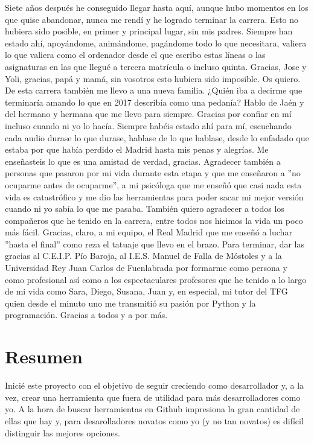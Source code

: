 \documentclass[a4paper, 12pt]{book}
\begin{document}
Siete años después he conseguido llegar hasta aquí, aunque hubo momentos en los que quise abandonar, nunca me rendí y he logrado terminar la carrera. Esto no hubiera sido posible, en primer y principal lugar, sin mis padres. Siempre han estado ahí, apoyándome, animándome, pagándome todo lo que necesitara, valiera lo que valiera como el ordenador desde el que escribo estas líneas o las asignaturas en las que llegué a tercera matrícula o incluso quinta. Gracias, Jose y Yoli, gracias, papá y mamá, sin vosotros esto hubiera sido imposible. Os quiero.
De esta carrera también me llevo a una nueva familia. ¿Quién iba a decirme que terminaría amando lo que en 2017 describía como una pedanía? Hablo de Jaén y del hermano y hermana que me llevo para siempre. Gracias por confiar en mí incluso cuando ni yo lo hacía. Siempre habéis estado ahí para mí, escuchando cada audio durase lo que durase, hablase de lo que hablase, desde lo enfadado que estaba por que había perdido el Madrid hasta mis penas y alegrías. Me enseñasteis lo que es una amistad de verdad, gracias. Agradecer también a personas que pasaron por mi vida durante esta etapa y que me enseñaron a ''no ocuparme antes de ocuparme'', a mi psicóloga que me enseñó que casi nada esta vida es catastrófico y me dio las herramientas para poder sacar mi mejor versión cuando ni yo sabía lo que me pasaba. También quiero agradecer a todos los compañeros que he tenido en la carrera, entre todos nos hicimos la vida un poco más fácil. Gracias, claro, a mi equipo, el Real Madrid que me enseñó a luchar ''hasta el final'' como reza el tatuaje que llevo en el brazo.
Para terminar, dar las gracias al C.E.I.P. Pío Baroja, al I.E.S. Manuel de Falla de Móstoles y a la Universidad Rey Juan Carlos de Fuenlabrada por formarme como persona y como profesional así como a los espectaculares profesores que he tenido a lo largo de mi vida como Sara, Diego, Susana, Juan y, en especial, mi tutor del TFG quien desde el minuto uno me transmitió su pasión por Python y la programación. Gracias a todos y a por más.


\chapter*{Resumen}

Inicié este proyecto con el objetivo de seguir creciendo como desarrollador y, a la vez, crear una herramienta que fuera de utilidad para más desarrolladores como yo. A la hora de buscar herramientas en Github impresiona la gran cantidad de ellas que hay y, para desarolladores novatos como yo (y no tan novatos) es difícil distinguir las mejores opciones.
\end{document}
